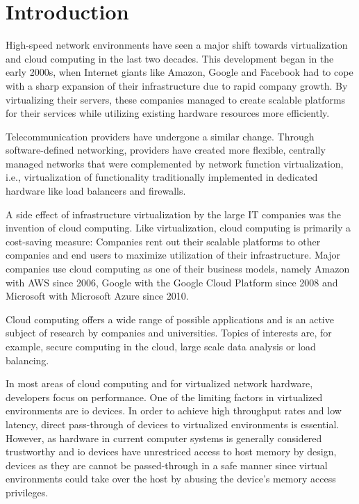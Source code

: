 \chapter{Introduction}
\label{chap:introduction}

High-speed network environments have seen a major shift towards virtualization
and cloud computing in the last two decades. This development began in the early
2000s, when Internet giants like Amazon, Google and Facebook had to cope with a
sharp expansion of their infrastructure due to rapid company growth. By
virtualizing their servers, these companies managed to create scalable platforms
for their services while utilizing existing hardware resources more efficiently.

Telecommunication providers have undergone a similar change. Through
software-defined networking, providers have created more flexible, centrally
managed networks that were complemented by network function virtualization,
i.e., virtualization of functionality traditionally implemented in dedicated
hardware like load balancers and firewalls.

A side effect of infrastructure virtualization by the large IT companies was the
invention of cloud computing. Like virtualization, cloud computing is primarily
a cost-saving measure: Companies rent out their scalable platforms to other
companies and end users to maximize utilization of their infrastructure. Major
companies use cloud computing as one of their business models, namely Amazon
with AWS since 2006, Google with the Google Cloud Platform since 2008 and
Microsoft with Microsoft Azure since 2010.

Cloud computing offers a wide range of possible applications and is an active
subject of research by companies and universities. Topics of interests are, for
example, secure computing in the cloud, large scale data analysis or load
balancing.

In most areas of cloud computing and for virtualized network hardware,
developers focus on performance. One of the limiting factors in virtualized
environments are \acs{io} devices. In order to achieve high throughput rates and
low latency, direct pass-through of devices to virtualized environments is
essential. However, as hardware in current computer systems is generally
considered trustworthy and \ac{io} devices have unrestriced access to host
memory by design, devices as they are cannot be passed-through in a safe manner
since virtual environments could take over the host by abusing the device's
memory access privileges.

